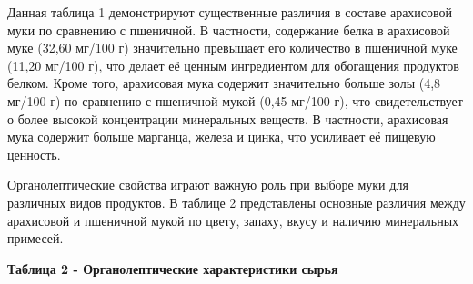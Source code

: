 {{{Данная таблица 1 демонстрируют существенные различия в составе
арахисовой муки по сравнению с пшеничной. В частности, содержание белка
в арахисовой муке (32,60 мг/100 г) значительно превышает его количество
в пшеничной муке (11,20 мг/100 г), что делает её ценным ингредиентом для
обогащения продуктов белком. Кроме того, арахисовая мука содержит
значительно больше золы (4,8 мг/100 г) по сравнению с пшеничной мукой
(0,45 мг/100 г), что свидетельствует о более высокой концентрации
минеральных веществ. В частности, арахисовая мука содержит больше
марганца, железа и цинка, что усиливает её пищевую ценность.

Органолептические свойства играют важную роль при выборе муки для
различных видов продуктов. В таблице 2 представлены основные различия
между арахисовой и пшеничной мукой по цвету, запаху, вкусу и наличию
минеральных примесей.

{\bfseries Таблица 2 - Органолептические характеристики сырья}


}}}
